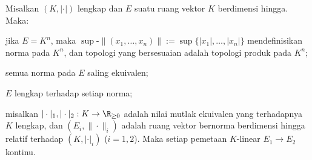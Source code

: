 \begin{proposition}\label{prop:finite-dim-norm}
	Misalkan $(K, |\cdot|)$ lengkap dan $E$ suatu ruang vektor $K$ berdimensi hingga. Maka:
	\begin{compactenum}[(i)]
		\item jika $E=K^n$, maka $\sup\text{-}\|(x_1, \ldots, x_n)\| := \sup\{|x_1|, \ldots, |x_n|\}$ mendefinisikan norma pada $K^n$, dan topologi yang bersesuaian adalah topologi produk pada $K^n$;
		\item semua norma pada $E$ saling ekuivalen;
		\item $E$ lengkap terhadap setiap norma;
		\item misalkan $|\cdot|_1, |\cdot|_2: K \to \R_{\geq 0}$ adalah nilai mutlak ekuivalen yang terhadapnya $K$ lengkap, dan $(E_i, \|\cdot\|_i)$ adalah ruang vektor bernorma berdimensi hingga relatif terhadap $(K, |\cdot|_i)$ ($i=1,2$). Maka setiap pemetaan $K$-linear $E_1 \to E_2$ kontinu.
	\end{compactenum}
\end{proposition}
